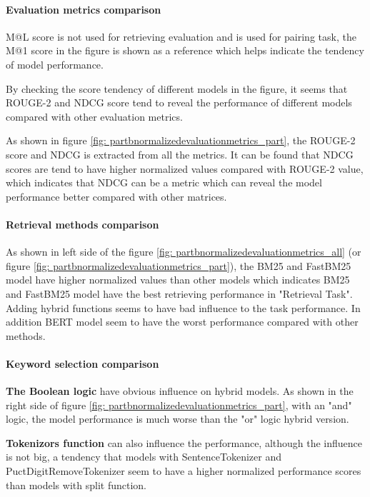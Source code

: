 \documentclass[10pt,a4paper,fleqn]{report}
\begin{document}
			
			\paragraph{Evaluation metrics comparison}
			
				M@L score is not used for retrieving evaluation and is used for pairing task, the M@1 score in the figure is shown as a reference which helps indicate the tendency of model performance.
				
				By checking the score tendency of different models in the figure, it seems that ROUGE-2 and NDCG score tend to reveal the performance of different models compared with other evaluation metrics.
				
				As shown in figure \ref{fig: partbnormalizedevaluationmetrics_part}, the ROUGE-2 score and NDCG is extracted from all the metrics.
				It can be found that NDCG scores are tend to have higher normalized values compared with ROUGE-2 value, which indicates that NDCG can be a metric which can reveal the model performance better compared with other matrices.
				
			\paragraph{Retrieval methods comparison}
				
				As shown in left side of the figure \ref{fig: partbnormalizedevaluationmetrics_all} (or figure \ref{fig: partbnormalizedevaluationmetrics_part}), the BM25 and FastBM25 model have higher normalized values than other models which indicates BM25 and FastBM25 model have the best retrieving performance in "Retrieval Task". Adding hybrid functions seems to have bad influence to the task performance. In addition BERT model seem to have the worst performance compared with other methods.
				
			\paragraph{Keyword selection comparison}
			
				\textbf{The Boolean logic} have obvious influence on hybrid models. As shown in the right side of figure \ref{fig: partbnormalizedevaluationmetrics_part}, with an "and" logic, the model performance is much worse than the "or" logic hybrid version.
				
				\textbf{Tokenizors function} can also influence the performance, although the influence is not big, a tendency that models with SentenceTokenizer and  PuctDigitRemoveTokenizer seem to have a higher normalized performance scores than models with split function.
				
\end{document}
